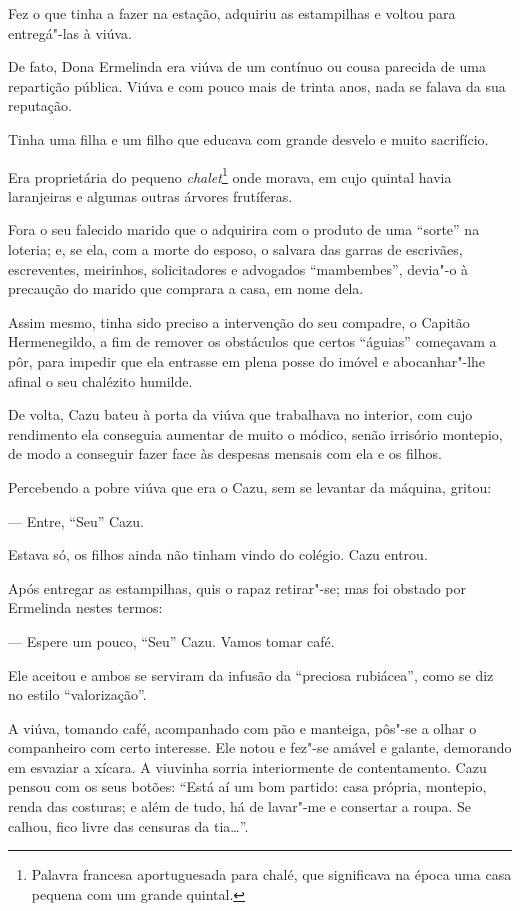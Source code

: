 Fez o que tinha a fazer na estação, adquiriu as estampilhas e voltou
para entregá"-las à viúva.

De fato, Dona Ermelinda era viúva de um contínuo ou cousa parecida de
uma repartição pública. Viúva e com pouco mais de trinta anos, nada se
falava da sua reputação.

Tinha uma filha e um filho que educava com grande desvelo e muito
sacrifício.

Era proprietária do pequeno \emph{chalet}\footnote{Palavra francesa
  aportuguesada para chalé, que significava na época uma casa pequena
  com um grande quintal.} onde morava, em cujo quintal havia laranjeiras
e algumas outras árvores frutíferas.

Fora o seu falecido marido que o adquirira com o produto de uma
``sorte'' na loteria; e, se ela, com a morte do esposo, o salvara das
garras de escrivães, escreventes, meirinhos, solicitadores e advogados
``mambembes'', devia"-o à precaução do marido que comprara a casa, em
nome dela.

Assim mesmo, tinha sido preciso a intervenção do seu compadre, o Capitão
Hermenegildo, a fim de remover os obstáculos que certos ``águias''
começavam a pôr, para impedir que ela entrasse em plena posse do imóvel
e abocanhar"-lhe afinal o seu chalézito humilde.

De volta, Cazu bateu à porta da viúva que trabalhava no interior, com
cujo rendimento ela conseguia aumentar de muito o módico, senão
irrisório montepio, de modo a conseguir fazer face às despesas mensais
com ela e os filhos.

Percebendo a pobre viúva que era o Cazu, sem se levantar da máquina,
gritou:

--- Entre, ``Seu'' Cazu.

Estava só, os filhos ainda não tinham vindo do colégio. Cazu entrou.

Após entregar as estampilhas, quis o rapaz retirar"-se; mas foi obstado
por Ermelinda nestes termos:

--- Espere um pouco, ``Seu'' Cazu. Vamos tomar café.

Ele aceitou e ambos se serviram da infusão da ``preciosa rubiácea'',
como se diz no estilo ``valorização''.

A viúva, tomando café, acompanhado com pão e manteiga, pôs"-se a olhar o
companheiro com certo interesse. Ele notou e fez"-se amável e galante,
demorando em esvaziar a xícara. A viuvinha sorria interiormente de
contentamento. Cazu pensou com os seus botões: ``Está aí um bom partido:
casa própria, montepio, renda das costuras; e além de tudo, há de
lavar"-me e consertar a roupa. Se calhou, fico livre das censuras da
tia\ldots{}''.

